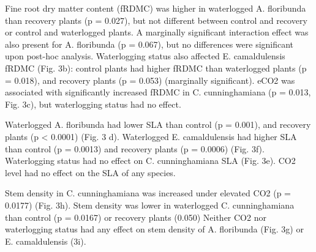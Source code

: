 \documentclass[12pt,a4paper]{memoir}
\begin{document}
Fine root dry matter content (fRDMC) was higher in waterlogged A. floribunda than recovery plants (p = 0.027), but not different between control and recovery or control and waterlogged plants. A marginally significant interaction effect was also present for A. floribunda (p = 0.067), but no differences were significant upon post-hoc analysis. Waterlogging status also affected E. camaldulensis fRDMC (Fig. 3b): control plants had higher fRDMC than waterlogged plants (p = 0.018), and recovery plants (p = 0.053) (marginally significant). eCO2 was associated with significantly increased fRDMC in C. cunninghamiana (p = 0.013, Fig. 3c), but waterlogging status had no effect.

Waterlogged A. floribunda had lower SLA than control (p = 0.001), and recovery plants (p < 0.0001) (Fig. 3 d). Waterlogged E. camaldulensis had higher SLA than control (p = 0.0013) and recovery plants (p = 0.0006) (Fig. 3f). Waterlogging status had no effect on C. cunninghamiana SLA (Fig. 3e). CO2 level had no effect on the SLA of any species. 

Stem density in C. cunninghamiana was increased under elevated CO2 (p = 0.0177) (Fig. 3h). Stem density was lower in waterlogged C. cunninghamiana than control (p = 0.0167) or recovery plants (0.050) Neither CO2 nor waterlogging status had any effect on stem density of A. floribunda (Fig. 3g) or E. camaldulensis (3i).
\end{document}
